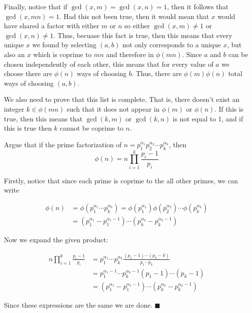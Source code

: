 \documentclass[11pt]{article}
\begin{document}
\begin{Parts}
\begin{solution}
      Finally, notice that if $\gcd(x, m) = \gcd(x, n) = 1$, then it follows that $\gcd(x, mn) = 1$. Had this not been true, then it would mean that $x$ would have shared a factor with either $m$ or $n$ so either $\gcd(x, m) \neq 1$ or $\gcd(x, n) \neq 1$. Thus, becuase this fact is true, then this means that every unique $x$ we found by selecting $(a, b)$ not only corresponds to a unique $x$, but also an $x$ which is coprime to $mn$ and therefore in $\phi(mn)$. Since $a$ and $b$ can be chosen independently of each other, this means that for every value of $a$ we choose there are $\phi(n)$ ways of choosing $b$. Thus, there are $\phi(m)\phi(n)$ total ways of choosing $(a, b)$.

      We also need to prove that this list is complete. That is, there doesn't exist an integer $k \in \phi(mn)$ such that it does not appear in $\phi(m)$ or $\phi(n)$. If this is true, then this means that $\gcd(k, m)$ or $\gcd(k, n)$ is not equal to 1, and if this is true then $k$ cannot be coprime to $n$. 

    \end{solution}

    \Part Argue that if the prime factorization of $n = p_1^{\alpha_1} p_2^{\alpha_2} \cdots p_k^{\alpha_k}$, then
    \[ \phi(n) = n \prod_{i = 1}^k \frac{p_i - 1}{p_i} \]
    
    \begin{solution}
    Firstly, notice that since each prime is coprime to the all other primes, we can write 


    \begin{align*}
      \phi(n) &= \phi(p_1^{\alpha_1} \cdots p_k^{\alpha_k}) = \phi(p_1^{\alpha_1})\phi(p_2^{\alpha_2}) \cdots \phi(p_k^{\alpha_k})\\
      &= (p_1^{\alpha_1} - p_1^{\alpha_1 - 1}) \cdots (p_k^{\alpha_k} - p_k^{\alpha_k - 1})
    \end{align*}

    Now we expand the given product:

    \begin{align*}
      n\prod_{i = 1}^k \frac{p_i - 1}{p_i} &= p_1^{\alpha_1} \cdots p_k^{\alpha_k} \frac{(p_1 - 1) \cdots (p_k - k)}{p_1 \cdots p_k}\\
      &= p_1^{\alpha_1 - 1}\cdots p_k^{\alpha_k - 1}(p_1 - 1) \cdots (p_k - 1)\\
      &= (p_1^{\alpha_1} - p_1^{\alpha_1 - 1}) \cdots (p_k^{\alpha_k} - p_k^{\alpha_k - 1})
    \end{align*}

    Since these expressions are the same we are done. $\blacksquare$
  \end{solution}


  \end{Parts}
\end{document}
